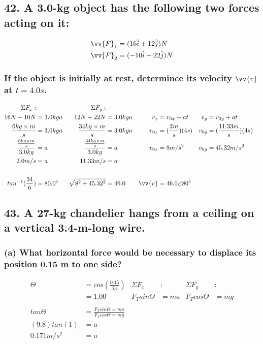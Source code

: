 \documentclass[12pt,a4paper,english]{article}
\begin{document}
\begin{flushleft}
  \subsection{42. A 3.0-kg object has the following two forces acting on it:}
  \begin{align*}
    \vv{F}_1&=(16\hat{i}+12\hat{j})N\\
    \vv{F}_2&=(-10\hat{i}+22\hat{j})N
  \end{align*}
  \subsubsection{If the object is initially at rest, determince its velocity $\vv{v}$ at $t=4.0s$.}
  \begin{align*}
    \Sigma F_x:&  &   \Sigma F_y:&\\
    16N-10N&=3.0kga 
       & 12N+22N&=3.0kga
       &v_x&=v_{0x}+at
       &v_y&=v_{0y}+at
       \\
    \frac{6kg\times m}{s}&=3.0kga
       &\frac{34kg\times m}{s}&=3.0kga
       &v_{0x}&=(\frac{2m}{s})(4s)
       &v_{0y}&=(\frac{11.33m}{s})(4s)
       \\
    \frac{\frac{6kg\times m}{s}}{3.0kg}&=a
       &\frac{\frac{34kg\times m}{s}}{3.0kg}&=a
       &v_{0x}&=8m/s^2
       &v_{0y}&=45.32m/s^2
       \\
    2.0m/s&=a
       &11.33m/s&=a
       \\
       \\
    tan^{-1}(\frac{34}{6})&=80.0^\circ 
       &\sqrt{8^2+45.32^2}&=46.0
       &\vv{v}&=46.0\angle 80^\circ
  \end{align*}
  \subsection{43. A 27-kg chandelier hangs from a ceiling on a vertical 3.4-m-long wire.}
  \subsubsection{(a) What horizontal force would be necessary to displace its position 0.15 m to one side?}
  \begin{align*}
    \Theta&=cos(\frac{0.15}{3.4})
      &\Sigma F_x&:
      &\Sigma F_y&:
    \\
    &=1.00^\circ
      &F_Tsin\Theta&=ma
      &F_Tcos\Theta&=mg
    \\
    \\
    tan\Theta&=\frac{F_Tsin\Theta=ma}{F_Tcos\Theta=mg}
    \\
    (9.8)tan(1)&=a
    \\
    0.171m/s^2&=a
    \\
  \end{align*}

\end{flushleft}
\end{document}
